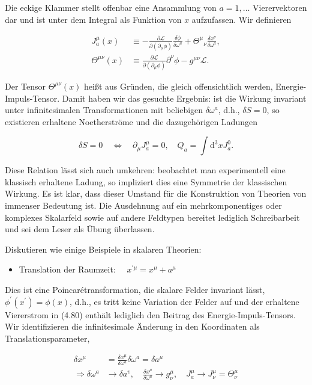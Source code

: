 \documentclass[10pt, letterpaper]{article}
\begin{document}
Die eckige Klammer stellt offenbar eine Ansammlung von $a=1, \ldots$ Vierervektoren dar und ist unter dem Integral als Funktion von $x$ aufzufassen. Wir definieren

$$
\begin{aligned}
J_{a}^{\mu}(x) & \equiv-\frac{\partial \mathscr{L}}{\partial\left(\partial_{\mu} \phi\right)} \frac{\delta \phi}{\delta \omega^{a}}+\Theta^{\mu}{ }_{\nu} \frac{\delta x^{\nu}}{\delta \omega^{a}}, \\
\Theta^{\mu \nu}(x) & \equiv \frac{\partial \mathscr{L}}{\partial\left(\partial_{\mu} \phi\right)} \partial^{\nu} \phi-g^{\mu \nu} \mathscr{L} .
\end{aligned}
$$

Der Tensor $\Theta^{\mu \nu}(x)$ heißt aus Gründen, die gleich offensichtlich werden, Energie-Impuls-Tensor. Damit haben wir das gesuchte Ergebnis: ist die Wirkung invariant unter infinitesimalen Transformationen mit beliebigen $\delta \omega^{a}$, d.h., $\delta S=0$, so existieren erhaltene Noetherströme und die dazugehörigen Ladungen

$$
\delta S=0 \quad \Leftrightarrow \quad \partial_{\mu} J_{a}^{\mu}=0, \quad Q_{a}=\int \mathrm{d}^{3} x J_{a}^{0} .
$$

Diese Relation lässt sich auch umkehren: beobachtet man experimentell eine klassisch erhaltene Ladung, so impliziert dies eine Symmetrie der klassischen Wirkung. Es ist klar, dass dieser Umstand für die Konstruktion von Theorien von immenser Bedeutung ist. Die Ausdehnung auf ein mehrkomponentiges oder komplexes Skalarfeld sowie auf andere Feldtypen bereitet lediglich Schreibarbeit und sei dem Leser als Übung überlassen.

Diskutieren wie einige Beispiele in skalaren Theorien:

\begin{itemize}
  \item Translation der Raumzeit: $\quad x^{\prime \mu}=x^{\mu}+a^{\mu}$
\end{itemize}

Dies ist eine Poincarétransformation, die skalare Felder invariant lässt, $\phi^{\prime}\left(x^{\prime}\right)= \phi(x)$, d.h., es tritt keine Variation der Felder auf und der erhaltene Viererstrom in (4.80) enthält lediglich den Beitrag des Energie-Impuls-Tensors. Wir identifizieren die infinitesimale Änderung in den Koordinaten als Translationsparameter,

$$
\begin{aligned}
\delta x^{\mu} & =\frac{\delta x^{\mu}}{\delta \omega^{a}} \delta \omega^{a}=\delta a^{\mu} \\
\Rightarrow \delta \omega^{a} & \rightarrow \delta a^{v}, \quad \frac{\delta x^{\mu}}{\delta \omega^{a}} \rightarrow g_{\nu}^{\mu}, \quad J_{a}^{\mu} \rightarrow J_{\nu}^{\mu}=\Theta_{\nu}^{\mu}
\end{aligned}
$$
\end{document}
